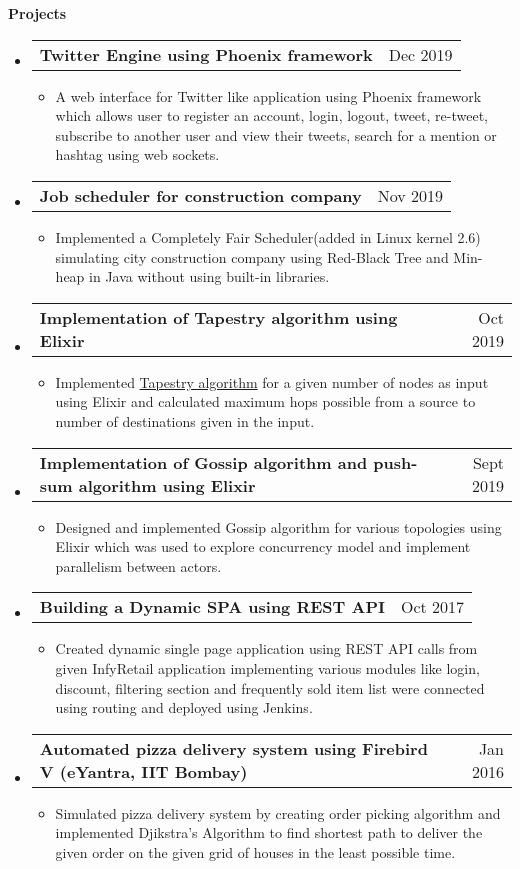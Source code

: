 \documentclass[letterpaper,12pt]{article}[leftmargin=*]
\makeatletter
\def \entryspacing {-2pt}
\def \entryspacingnew {-4pt}
\renewcommand{\section}[2]{\vspace{5pt}
  \colorbox{secondary}{\color{white}\raggedbottom\normalsize\textbf{{#1}{\hspace{7pt}#2}}}
}
\newcommand{\resumeEntryStart}{\begin{itemize}[leftmargin=2.5mm]\vspace{\entryspacingnew}}
\newcommand{\resumeEntryEnd}{\end{itemize}\vspace{\entryspacingnew}}
\newcommand{\resumeItemListStart}{\begin{itemize}[leftmargin=4.5mm]}
\newcommand{\resumeItemListEnd}{\end{itemize}\vspace{\entryspacing}}
\newcommand{\resumeItem}[1]{
  \item\small{
    {#1 \vspace{-2pt}}
  }
}
\newcommand{\resumeEntryTD}[2]{
  \vspace{-1pt}\item[]
    \begin{tabular*}{0.97\textwidth}{l@{\extracolsep{\fill}}r}
      \textbf{\color{primary}#1} & {\firabook\color{accent}\small#2} \\
    \end{tabular*}\vspace{-10pt}
}
\makeatother
\begin{document}

\hspace{-15pt}\section{\faFlask}{Projects}

  \resumeEntryStart
    \resumeEntryTD
      {Twitter Engine using Phoenix framework}{Dec 2019}
    \resumeItemListStart
      \resumeItem {A web interface for Twitter like application using Phoenix framework which allows user to register an account, login, logout, tweet, re-tweet, subscribe to another user and view their tweets, search for a mention or hashtag using web sockets.}
    \resumeItemListEnd
  \resumeEntryEnd
  \vspace{-3pt}
  \resumeEntryStart
   \resumeEntryTD
      {Job scheduler for construction company}{Nov 2019}
    \resumeItemListStart
      \resumeItem {Implemented a Completely Fair Scheduler(added in Linux kernel 2.6) simulating city construction company using Red-Black Tree and Min- heap in Java without using built-in libraries.}
    \resumeItemListEnd
  \resumeEntryEnd

  \resumeEntryStart
    \resumeEntryTD
      {Implementation of Tapestry algorithm using Elixir}{Oct 2019}
    \resumeItemListStart
      \resumeItem {Implemented \href{ https://pdos.csail.mit.edu/~strib/docs/tapestry/tapestry_jsac03.pdf}{Tapestry algorithm} for a given number of nodes as input using Elixir and calculated maximum hops possible from a source to number of destinations given in the input.}
    \resumeItemListEnd
  \resumeEntryEnd

  \resumeEntryStart
    \resumeEntryTD
      {Implementation of Gossip algorithm and push-sum algorithm using Elixir}{Sept 2019}
    \resumeItemListStart
      \resumeItem {Designed and implemented Gossip algorithm for various topologies using Elixir which was used to explore concurrency model and implement parallelism between actors. }
    \resumeItemListEnd
  \resumeEntryEnd
   \resumeEntryStart
    \resumeEntryTD
      {Building a Dynamic SPA using REST API}{Oct 2017}
    \resumeItemListStart
      \resumeItem {Created dynamic single page application using REST API calls from given InfyRetail application implementing various modules like login, discount, filtering section and frequently sold item list were connected using routing and deployed using Jenkins.}
    \resumeItemListEnd
  \resumeEntryEnd
   \resumeEntryStart
    \resumeEntryTD
      {Automated pizza delivery system using Firebird V (eYantra, IIT Bombay)}{Jan 2016}
    \resumeItemListStart
      \resumeItem {Simulated pizza delivery system by creating order picking algorithm and implemented Djikstra’s Algorithm to find shortest path to deliver the given order on the given grid of houses in the least possible time.}
    \resumeItemListEnd
  \resumeEntryEnd
  
\end{document}
